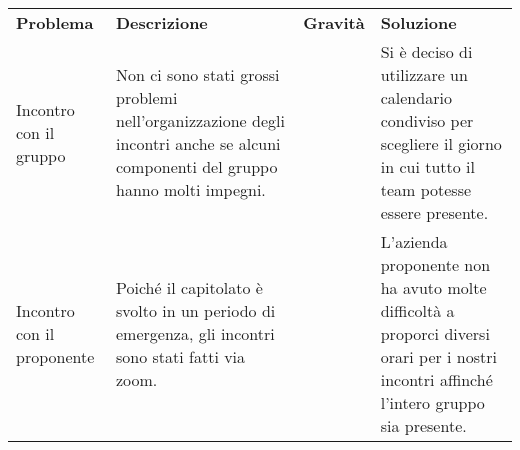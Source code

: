 \begin{table}[H]
    \caption{Tabella delle problematiche relative all'organizzazione}
\renewcommand{\arraystretch}{1.5}
\begin{longtable}{  >{\centering}p{} >{}p{}
    >{\centering}p{} >{}p{}}
    \rowcolor{\primaryColor}
    \textcolor{\secondaryColor}{
    \centering\textbf{Problema}}     & \textcolor{\secondaryColor}{\centering\textbf{Descrizione}}    & \textcolor{\secondaryColor}
    {\centering\textbf{Gravità}} & \textcolor{\secondaryColor}{\centering\textbf{Soluzione}}\\
   
    Incontro con il gruppo  
    & Non ci sono stati grossi problemi nell’organizzazione degli incontri 
    anche se alcuni componenti del gruppo hanno molti impegni.  
    & 1  
    & Si è deciso di utilizzare un
    calendario condiviso per scegliere il giorno in cui tutto il
    team potesse essere presente.{} \\
    Incontro con il proponente
    & Poiché il capitolato è svolto in un periodo di emergenza, 
    gli incontri sono stati fatti via zoom. 
    & 1
    & L’azienda proponente non ha avuto molte difficoltà a proporci 
    diversi orari per i nostri incontri affinché l’intero gruppo sia presente.{} \\
    \end{longtable}
\end{table}
